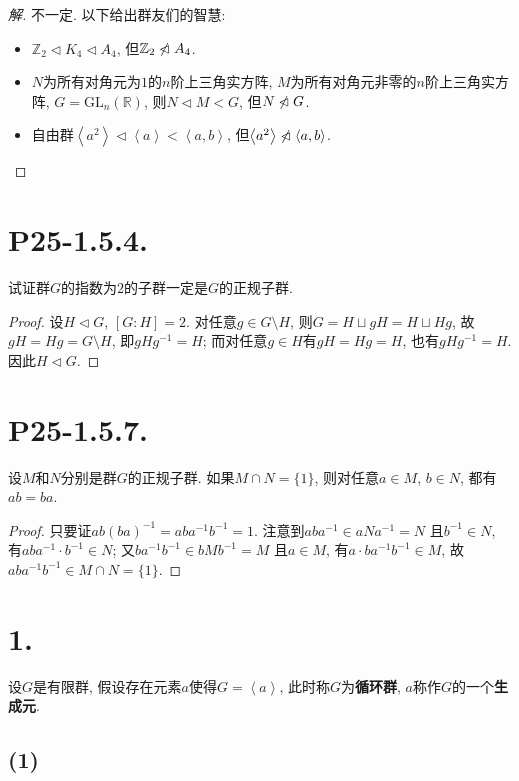 \documentclass[12pt, a4paper, fontset=windows]{ctexart}
\newcommand{\R}{\mathbb{R}}
\newcommand{\Z}{\mathbb{Z}}
\newcommand{\gen}[1]{\left\langle{#1}\right\rangle}
\newcommand{\nlhd}{\centernot{\lhd}}
\newenvironment{solution}{\begin{proof}[解]}{\end{proof}}
\begin{document}
\begin{solution}
不一定. 以下给出群友们的智慧: 

\begin{itemize}[itemsep=0em]
    \item $\Z_2\lhd K_4\lhd A_4$, 但$\Z_2\nlhd A_4$. 
    \item $N$为所有对角元为$1$的$n$阶上三角实方阵, $M$为所有对角元非零的$n$阶上三角实方阵, $G=\text{GL}_n(\R)$, 则$N\lhd M<G$, 但$N\nlhd G$. 
    \item 自由群$\gen{a^2}\lhd\gen{a}<\gen{a,b}$, 但$\gen{a^2}\nlhd\gen{a,b}$. 
\end{itemize}
\end{solution}

\section*{P25-1.5.4.}

试证群$G$的指数为$2$的子群一定是$G$的正规子群. 

\begin{proof}
设$H\lhd G$, $[G:H]=2$. 对任意$g\in G\setminus H$, 则$G=H\sqcup gH=H\sqcup Hg$, 
故$gH=Hg=G\setminus H$, 即$gHg^{-1}=H$; 而对任意$g\in H$有$gH=Hg=H$, 也有$gHg^{-1}=H$. 
因此$H\lhd G$. 
\end{proof}

\section*{P25-1.5.7.}

设$M$和$N$分别是群$G$的正规子群. 如果$M\cap N=\{1\}$, 
则对任意$a\in M$, $b\in N$, 都有$ab=ba$. 

\begin{proof}
只要证$ab(ba)^{-1}=aba^{-1}b^{-1}=1$. 注意到$aba^{-1}\in aNa^{-1}=N$
且$b^{-1}\in N$, 有$aba^{-1}\cdot b^{-1}\in N$; 又$ba^{-1}b^{-1}\in bMb^{-1}=M$
且$a\in M$, 有$a\cdot ba^{-1}b^{-1}\in M$, 故$aba^{-1}b^{-1}\in M\cap N=\{1\}$. 
\end{proof}

\section*{1.}

设$G$是有限群, 假设存在元素$a$使得$G=\gen{a}$, 
此时称$G$为{\bf 循环群}, $a$称作$G$的一个{\bf 生成元}. 

\subsection*{(1)}
\end{document}
